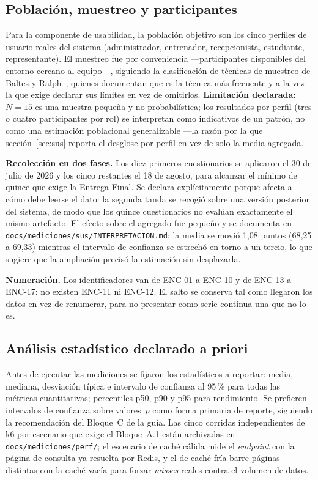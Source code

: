 \documentclass[11pt,a4paper]{article}
\newcommand{\ruta}[1]{\texttt{\footnotesize #1}}
\begin{document}
\subsection{Población, muestreo y participantes}
\label{sec:muestreo}

Para la componente de usabilidad, la población objetivo son los cinco
perfiles de usuario reales del sistema (administrador, entrenador,
recepcionista, estudiante, representante). El muestreo fue por
conveniencia —participantes disponibles del entorno cercano al
equipo—, siguiendo la clasificación de técnicas de muestreo de Baltes y
Ralph~\cite{baltesralph2022}, quienes documentan que es la técnica más
frecuente y a la vez la que exige declarar sus límites en vez de
omitirlos. \textbf{Limitación declarada:} $N=15$ es una muestra pequeña
y no probabilística; los resultados por perfil (tres o cuatro
participantes por rol) se interpretan como indicativos de un patrón, no
como una estimación poblacional generalizable —la razón por la que
sección~\ref{sec:sus} reporta el desglose por perfil en vez de solo la
media agregada.

\textbf{Recolección en dos fases.} Los diez primeros cuestionarios se
aplicaron el 30 de julio de 2026 y los cinco restantes el 18 de agosto,
para alcanzar el mínimo de quince que exige la Entrega Final. Se declara
explícitamente porque afecta a cómo debe leerse el dato: la segunda
tanda se recogió sobre una versión posterior del sistema, de modo que
los quince cuestionarios no evalúan exactamente el mismo artefacto. El
efecto sobre el agregado fue pequeño y se documenta en
\ruta{docs/mediciones/sus/INTERPRETACION.md}: la media se movió 1{,}08
puntos (68{,}25 a 69{,}33) mientras el intervalo de confianza se
estrechó en torno a un tercio, lo que sugiere que la ampliación precisó
la estimación sin desplazarla.

\textbf{Numeración.} Los identificadores van de ENC-01 a ENC-10 y de
ENC-13 a ENC-17: no existen ENC-11 ni ENC-12. El salto se conserva tal
como llegaron los datos en vez de renumerar, para no presentar como
serie continua una que no lo es.

\subsection{Análisis estadístico declarado a priori}
\label{sec:analisis-estadistico}

Antes de ejecutar las mediciones se fijaron los estadísticos a reportar:
media, mediana, desviación típica e intervalo de confianza al 95\,\%
para todas las métricas cuantitativas; percentiles p50, p90 y p95 para
rendimiento. Se prefieren intervalos de confianza sobre valores~$p$ como
forma primaria de reporte, siguiendo la recomendación del Bloque~C de la
guía. Las cinco corridas independientes de k6 por escenario que exige el
Bloque~A.1 están archivadas en \ruta{docs/mediciones/perf/}; el escenario
de caché cálida mide el \emph{endpoint} con la página de consulta ya
resuelta por Redis, y el de caché fría barre páginas distintas con la
caché vacía para forzar \emph{misses} reales contra el volumen de datos.
\end{document}

